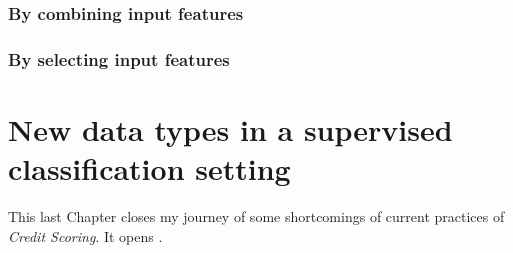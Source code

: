 \subsubsection{By combining input features}



\subsubsection{By selecting input features}


\section{New data types in a supervised classification setting}


\bigskip

This last Chapter closes my journey of some shortcomings of current practices of \textit{Credit Scoring}. It opens .


\printbibliography[heading=subbibliography, title=References of Chapter 6]